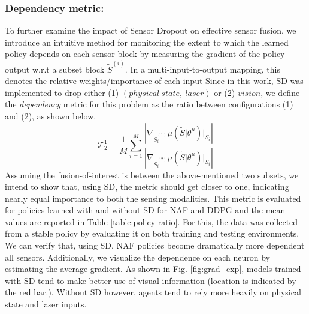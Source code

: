 \documentclass[../thesis.tex]{subfiles}
\begin{document}
\subsubsection{Dependency metric:}
To further examine the impact of Sensor Dropout on effective sensor fusion, we introduce an intuitive method for monitoring the extent to which the learned policy depends on each sensor block by measuring the gradient of the policy output w.r.t a subset block $\tilde{S}^{(i)}$. In a multi-input-to-output mapping, this denotes the relative weights/importance of each input 
Since in this work, SD was implemented to drop either (1) $(physical~state,~ laser)$ or (2) $vision$, we define the \emph{dependency} metric for this problem as the ratio between configurations (1) and (2), as shown below.  
\begin{equation}
\mathcal{T}_2^1 = \frac{1}{M}\sum_{i=1}^M \frac{\left| \nabla_{\tilde{S}^{(1)}_i} \mu (\tilde{S} | \theta^\mu )\Big|_{S_i} \right|}{\left| \nabla_{\tilde{S}^{(2)}_i} \mu (\tilde{S} | \theta^\mu )\Big|_{S_i} \right|} 
\label{equ:grad_metric}
\end{equation}
 Assuming the fusion-of-interest is between the above-mentioned two subsets, we intend to show that, using SD, the metric should get closer to one, indicating nearly equal importance to both the sensing modalities. This metric is evaluated for policies learned with and without SD for NAF and DDPG and the mean values are reported in Table \ref{table:policy-ratio}. For this, the data was collected from a stable policy by evaluating it on both training and testing environments. We can verify that, using SD, NAF policies become dramatically more dependent all sensors. Additionally, we visualize the dependence on each neuron by estimating the average gradient. As shown in Fig. \ref{fig:grad_exp}, models trained with SD tend to make better use of visual information (location is indicated by the red bar.). Without SD however, agents tend to rely more heavily on physical state and laser inputs. 
\end{document}
